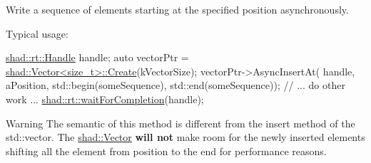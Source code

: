 Write a sequence of elements starting at the specified position asynchronously. 

Typical usage\-: 
\begin{DoxyCode}
\hyperlink{classshad_1_1rt_1_1Handle}{shad::rt::Handle} handle;
\textcolor{keyword}{auto} vectorPtr = \hyperlink{classshad_1_1AbstractDataStructure_a31b56084146be9afeb69a2b14970aba1}{shad::Vector<size\_t>::Create}(kVectorSize);
vectorPtr->AsyncInsertAt(
  handle, aPosition, std::begin(someSequence), std::end(someSequence));
\textcolor{comment}{// ... do other work ...}
\hyperlink{namespaceshad_1_1rt_a6ea1d3672bac3a80032863b6732a0c0a}{shad::rt::waitForCompletion}(handle);
\end{DoxyCode}


\begin{DoxyWarning}{Warning}
The semantic of this method is different from the insert method of the std\-::vector. The \hyperlink{classshad_1_1Vector}{shad\-::\-Vector} {\bfseries will not} make room for the newly inserted elements shifting all the element from position to the end for performance reasons.
\end{DoxyWarning}

